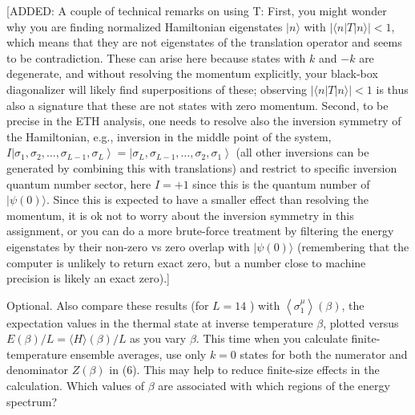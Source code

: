 \documentclass[12pt]{article}
\begin{document}
[ADDED: A couple of technical remarks on using T: First, you might wonder why you are finding normalized Hamiltonian eigenstates $|n\rangle$ with $|\langle n|T| n\rangle|<1$, which means that they are not eigenstates of the translation operator and seems to be contradiction. These can arise here because states with $k$ and $-k$ are degenerate, and without resolving the momentum explicitly, your black-box diagonalizer will likely find superpositions of these; observing $|\langle n|T| n\rangle|<1$ is thus also a signature that these are not states with zero momentum. Second, to be precise in the ETH analysis, one needs to resolve also the inversion symmetry of the Hamiltonian, e.g., inversion in the middle point of the system, $I\left|\sigma_{1}, \sigma_{2}, \ldots, \sigma_{L-1}, \sigma_{L}\right\rangle=\left|\sigma_{L}, \sigma_{L-1}, \ldots, \sigma_{2}, \sigma_{1}\right\rangle$ (all other inversions can be generated by combining this with translations) and restrict to specific inversion quantum number sector, here $I=+1$ since this is the quantum number of $|\psi(0)\rangle$. Since this is expected to have a smaller effect than resolving the momentum, it is ok not to worry about the inversion symmetry in this assignment, or you can do a more brute-force treatment by filtering the energy eigenstates by their non-zero vs zero overlap with $|\psi(0)\rangle$ (remembering that the computer is unlikely to return exact zero, but a number close to machine precision is likely an exact zero).]

Optional. Also compare these results (for $L=14$ ) with $\left\langle\sigma_{1}^{\mu}\right\rangle(\beta)$, the expectation values in the thermal state at inverse temperature $\beta$, plotted versus $E(\beta) / L=\langle H\rangle(\beta) / L$ as you vary $\beta$. This time when you calculate finite-temperature ensemble averages, use only $k=0$ states for both the numerator and denominator $Z(\beta)$ in (6). This may help to reduce finite-size effects in the calculation. Which values of $\beta$ are associated with which regions of the energy spectrum?
\end{document}
